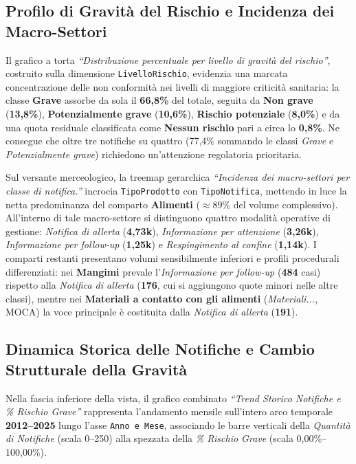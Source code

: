 
\subsection{Profilo di Gravità del Rischio e Incidenza dei Macro-Settori}
Il grafico a torta \textit{``Distribuzione percentuale per livello di gravità del rischio''}, costruito sulla dimensione \texttt{LivelloRischio}, evidenzia una marcata concentrazione delle non conformità nei livelli di maggiore criticità sanitaria: la classe \textbf{Grave} assorbe da sola il \textbf{66,8\%} del totale, seguita da \textbf{Non grave} (\textbf{13,8\%}), \textbf{Potenzialmente grave} (\textbf{10,6\%}), \textbf{Rischio potenziale} (\textbf{8,0\%}) e da una quota residuale classificata come \textbf{Nessun rischio} pari a circa lo \textbf{0,8\%}. Ne consegue che oltre tre notifiche su quattro (77,4\% sommando le classi \textit{Grave} e \textit{Potenzialmente grave}) richiedono un'attenzione regolatoria prioritaria.

Sul versante merceologico, la treemap gerarchica \textit{``Incidenza dei macro-settori per classe di notifica.''} incrocia \texttt{TipoProdotto} con \texttt{TipoNotifica}, mettendo in luce la netta predominanza del comparto \textbf{Alimenti} ($\approx 89\%$ del volume complessivo). All'interno di tale macro-settore si distinguono quattro modalità operative di gestione: \textit{Notifica di allerta} (\textbf{4,73k}), \textit{Informazione per attenzione} (\textbf{3,26k}), \textit{Informazione per follow-up} (\textbf{1,25k}) e \textit{Respingimento al confine} (\textbf{1,14k}). I comparti restanti presentano volumi sensibilmente inferiori e profili procedurali differenziati: nei \textbf{Mangimi} prevale l'\textit{Informazione per follow-up} (\textbf{484} casi) rispetto alla \textit{Notifica di allerta} (\textbf{176}, cui si aggiungono quote minori nelle altre classi), mentre nei \textbf{Materiali a contatto con gli alimenti} (\textit{Materiali...}, MOCA) la voce principale è costituita dalla \textit{Notifica di allerta} (\textbf{191}).

\subsection{Dinamica Storica delle Notifiche e Cambio Strutturale della Gravità}
Nella fascia inferiore della vista, il grafico combinato \textit{``Trend Storico Notifiche e \% Rischio Grave''} rappresenta l'andamento mensile sull'intero arco temporale \textbf{2012--2025} lungo l'asse \texttt{Anno e Mese}, associando le barre verticali della \textit{Quantità di Notifiche} (scala 0--250) alla spezzata della \textit{\% Rischio Grave} (scala 0,00\%--100,00\%).

